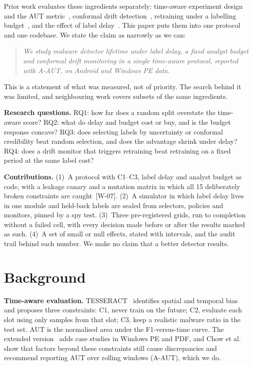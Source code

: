 \documentclass[conference,a4paper]{IEEEtran}
\newcommand{\clm}[1]{{\scriptsize[#1]}}
\begin{document}
Prior work evaluates these ingredients separately: time-aware experiment design and the AUT metric~\cite{pendlebury2019tesseract,kan2024tesseractext,chow2025beyond}, conformal drift detection~\cite{barbero2022transcending}, retraining under a labelling budget~\cite{chen2023continuous,amalapuram2026seed}, and the effect of label delay~\cite{botacin2025labeldelays}. This paper puts them into one protocol and one codebase. We state the claim as narrowly as we can:

\begin{quote}
\emph{We study malware detector lifetime under label delay, a fixed analyst budget and conformal drift monitoring in a single time-aware protocol, reported with A-AUT, on Android and Windows PE data.}
\end{quote}

This is a statement of what was measured, not of priority. The search behind it was limited, and neighbouring work covers subsets of the same ingredients.

\textbf{Research questions.} RQ1: how far does a random split overstate the time-aware score? RQ2: what do delay and budget cost or buy, and is the budget response concave? RQ3: does selecting labels by uncertainty or conformal credibility beat random selection, and does the advantage shrink under delay? RQ4: does a drift monitor that triggers retraining beat retraining on a fixed period at the same label cost?

\textbf{Contributions.}
(1)~A protocol with C1--C3, label delay and analyst budget as code, with a leakage canary and a mutation matrix in which all 15 deliberately broken constraints are caught~\clm{W-07}.
(2)~A simulator in which label delay lives in one module and held-back labels are sealed from selectors, policies and monitors, pinned by a spy test.
(3)~Three pre-registered grids, run to completion without a failed cell, with every decision made before or after the results marked as such.
(4)~A set of small or null effects, stated with intervals, and the audit trail behind each number.
We make no claim that a better detector results.

\section{Background}
\textbf{Time-aware evaluation.} TESSERACT~\cite{pendlebury2019tesseract} identifies spatial and temporal bias and proposes three constraints: C1, never train on the future; C2, evaluate each slot using only samples from that slot; C3, keep a realistic malware ratio in the test set. AUT is the normalised area under the F1-versus-time curve. The extended version~\cite{kan2024tesseractext} adds case studies in Windows PE and PDF, and Chow et al.~\cite{chow2025beyond} show that factors beyond these constraints still cause discrepancies and recommend reporting AUT over rolling windows (A-AUT), which we do.
\end{document}

